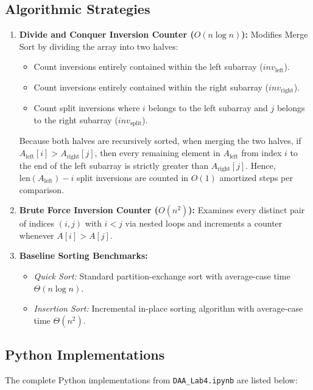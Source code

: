 \documentclass[12pt]{article}
\begin{document}
\subsection{Algorithmic Strategies}
\begin{enumerate}
    \item \textbf{Divide and Conquer Inversion Counter ($O(n \log n)$):}
    Modifies Merge Sort by dividing the array into two halves:
    \begin{itemize}
        \item Count inversions entirely contained within the left subarray ($inv_{\text{left}}$).
        \item Count inversions entirely contained within the right subarray ($inv_{\text{right}}$).
        \item Count split inversions where $i$ belongs to the left subarray and $j$ belongs to the right subarray ($inv_{\text{split}}$).
    \end{itemize}
    Because both halves are recursively sorted, when merging the two halves, if $A_{\text{left}}[i] > A_{\text{right}}[j]$, then every remaining element in $A_{\text{left}}$ from index $i$ to the end of the left subarray is strictly greater than $A_{\text{right}}[j]$. Hence, $\text{len}(A_{\text{left}}) - i$ split inversions are counted in $O(1)$ amortized steps per comparison.
    \item \textbf{Brute Force Inversion Counter ($O(n^2)$):}
    Examines every distinct pair of indices $(i, j)$ with $i < j$ via nested loops and increments a counter whenever $A[i] > A[j]$.
    \item \textbf{Baseline Sorting Benchmarks:}
    \begin{itemize}
        \item \textit{Quick Sort:} Standard partition-exchange sort with average-case time $\Theta(n \log n)$.
        \item \textit{Insertion Sort:} Incremental in-place sorting algorithm with average-case time $\Theta(n^2)$.
    \end{itemize}
\end{enumerate}

\subsection{Python Implementations}
The complete Python implementations from \texttt{DAA\_Lab4.ipynb} are listed below:
\end{document}
